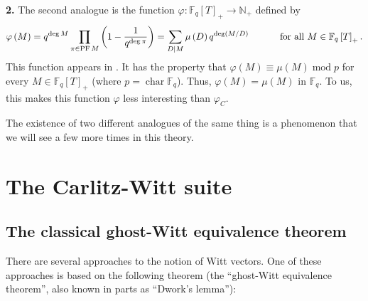 \documentclass[numbers=enddot,12pt,final,onecolumn,notitlepage]{scrartcl}%
\theoremstyle{definition}
\let\sumnonlimits\sum
\let\prodnonlimits\prod
\renewcommand{\sum}{\sumnonlimits\limits}
\renewcommand{\prod}{\prodnonlimits\limits}
\begin{document}
\textbf{2.} The second analogue is the function $\varphi:\mathbb{F}_{q}\left[
T\right]  _{+}\rightarrow\mathbb{N}_{+}$ defined by%
\[
\varphi\left(  M\right)  =q^{\deg M}\prod\limits_{\pi\in\operatorname*{PF}%
M}\left(  1-\dfrac{1}{q^{\deg\pi}}\right)  =\sum\limits_{D\mid M}\mu\left(
D\right)  q^{\deg\left(  M / D\right)  }\ \ \ \ \ \ \ \ \ \ \text{for all
}M\in\mathbb{F}_{q}\left[  T\right]  _{+}.
\]
This function appears in \cite[Section 6]{kc-carlitz}. It has the property
that $\varphi\left(  M\right)  \equiv\mu\left(  M\right)  \operatorname{mod}p$
for every $M\in\mathbb{F}_{q}\left[  T\right]  _{+}$ (where
$p=\operatorname*{char}\mathbb{F}_{q}$). Thus, $\varphi\left(  M\right)
=\mu\left(  M\right)  $ in $\mathbb{F}_{q}$. To us, this makes this function
$\varphi$ less interesting than $\varphi_{C}$.

The existence of two different analogues of the same thing is a phenomenon
that we will see a few more times in this theory.

\section{\label{sect.carlitzwitt}The Carlitz-Witt suite}

\subsection{The classical ghost-Witt equivalence theorem}

There are several approaches to the notion of Witt vectors. One of these
approaches is based on the following theorem (the ``ghost-Witt equivalence
theorem'', also known in parts as \textquotedblleft Dwork's
lemma\textquotedblright):
\end{document}
